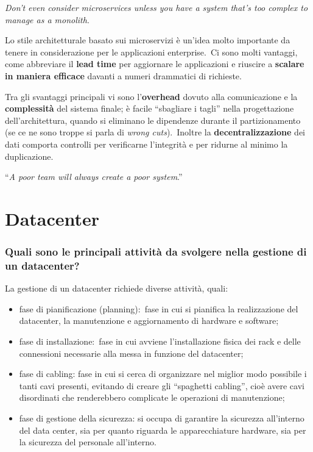 \documentclass[12pt, a4paper]{article}
\begin{document}
\begin{flushleft}
	\textit{Don't even consider microservices unless you have a system that's too complex to manage as a monolith}.\qquad [M.\ Fowler]
\end{flushleft}

\noindent Lo stile architetturale basato sui microservizi è un'idea molto importante da tenere in considerazione per le applicazioni enterprise.\
Ci sono molti vantaggi, come abbreviare il \textbf{lead time} per aggiornare le applicazioni e riuscire a \textbf{scalare in maniera efficace} davanti a numeri drammatici di richieste.\

Tra gli svantaggi principali vi sono l'\textbf{overhead} dovuto alla comunicazione e la \textbf{complessità} del sistema finale; è facile ``sbagliare i tagli'' nella progettazione dell'architettura, quando si eliminano le dipendenze durante il  partizionamento (se ce ne sono troppe si parla di \textit{wrong cuts}).\
Inoltre la \textbf{decentralizzazione} dei dati comporta controlli per verificarne l'integrità e per ridurne al minimo la duplicazione.\ 

\begin{center}
 ``\textit{A poor team will always create a poor system}.''
\end{center}


\section{Datacenter}
\subsubsection*{Quali sono le principali attività da svolgere nella gestione di un datacenter?}
La gestione di un datacenter richiede diverse attività, quali:
\begin{itemize}
	\item fase di pianificazione (planning):\ fase in cui si pianifica la realizzazione del datacenter, la manutenzione e aggiornamento di hardware e software;
	\item fase di installazione:\ fase in cui avviene l'installazione fisica dei rack e delle connessioni necessarie alla messa in funzione del datacenter;
	\item fase di cabling: fase in cui si cerca di organizzare nel miglior modo possibile i tanti cavi presenti, evitando di creare gli ``spaghetti cabling'', cioè avere cavi disordinati che renderebbero complicate le operazioni di manutenzione;
	\item fase di gestione della sicurezza: si occupa di garantire la sicurezza all'interno del data center, sia per quanto riguarda le apparecchiature hardware, sia per la sicurezza del personale all'interno.
\end{itemize}
\end{document}
